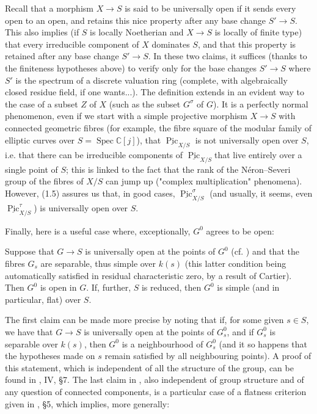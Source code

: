 \begin{remark}\label{fga3.vi-1-remark-1.6}
    Recall that a morphism $X\to S$ is said to be universally open if it sends every open to an open, and retains this nice property after any base change $S'\to S$.
    This also implies (if $S$ is locally Noetherian and $X\to S$ is locally of finite type) that every irreducible component of $X$ dominates $S$, and that this property is retained after any base change $S'\to S$.
    In these two claims, it suffices (thanks to the finiteness hypotheses above) to verify only for the base changes $S'\to S$ where $S'$ is the spectrum of a discrete valuation ring (complete, with algebraically closed residue field, if one wants...).
    The definition extends in an evident way to the case of a subset $Z$ of $X$ (such as the subset $G^\sigma$ of $G$).
    It is a perfectly normal phenomenon, even if we start with a simple projective morphism $X\to S$ with connected geometric fibres (for example, the fibre square of the modular family of elliptic curves over $S=\operatorname{Spec}\mathbb{C}[j]$), that $\underline{\operatorname{Pic}}_{X/S}$ is not universally open over $S$, i.e. that there can be irreducible components of $\underline{\operatorname{Pic}}_{X/S}$that live entirely over a single point of $S$;
    this is linked to the fact that the rank of the Néron–Severi group of the fibres of $X/S$ can jump up ("complex multiplication" phenomena).
    However, (1.5)  assures us that, in good cases, $\underline{\operatorname{Pic}}_{X/S}^\sigma$ (and usually, it seems, even $\underline{\operatorname{Pic}}_{X/S}^\tau$) is universally open over $S$.
\end{remark}


Finally, here is a useful case where, exceptionally, $G^0$ agrees to be open:

\begin{corollary}\label{fga3.vi-1-corollary-1.7}
    Suppose that $G\to S$ is universally open at the points of $G^0$ (cf. ) and that the fibres $G_s$ are separable, thus simple over $k(s)$ (this latter condition being automatically satisfied in residual characteristic zero, by a result of Cartier).
    Then $G^0$ is open in $G$.
    If, further, $S$ is reduced, then $G^0$ is simple (and in particular, flat) over $S$.
\end{corollary}

\begin{cproof}
    The first claim can be made more precise by noting that if, for some given $s\in S$, we have that $G\to S$ is universally open at the points of $G_s^0$, and if $G_s^0$ is separable over $k(s)$, then $G^0$ is a neighbourhood of $G_s^0$ (and it so happens that the hypotheses made on $s$ remain satisfied by all neighbouring points).
    A proof of this statement, which is independent of all the structure of the group, can be found in \cite{GD1960}, IV, §7.
    The last claim in , also independent of group structure and of any question of connected components, is a particular case of a flatness criterion given in \cite{Gro1960b}, §5, which implies, more generally:
\end{cproof}

